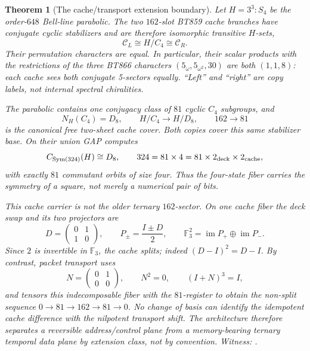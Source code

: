 \documentclass[11pt]{article}
\newtheorem{theorem}{Theorem}[section]
\newcommand{\GF}[1]{\mathbb{F}_{#1}}
\begin{document}
\begin{theorem}[The cache/transport extension boundary]
\label{thm:cache-transport-boundary}
Let $H=3^3{:}S_4$ be the order-$648$ Bell-line parabolic.  The two
$162$-slot BT859 cache branches have conjugate cyclic stabilizers and
are therefore isomorphic transitive $H$-sets,
\[
  \mathcal C_L\cong H/C_4\cong\mathcal C_R.
\]
Their permutation characters are equal.  In particular, their scalar
products with the restrictions of the three BT866 characters
$(5_\omega,5_{\omega^2},30)$ are both $(1,1,8)$: each cache sees both
conjugate 5-sectors equally.  ``Left'' and ``right'' are copy labels,
not internal spectral chiralities.

The parabolic contains one conjugacy class of $81$ cyclic $C_4$
subgroups, and
\[
 N_H(C_4)=D_8,
 \qquad
 H/C_4\longrightarrow H/D_8,
 \qquad
 162\longrightarrow81
\]
is the canonical free two-sheet cache cover.  Both copies cover this
same stabilizer base.  On their union GAP computes
\[
 C_{\operatorname{Sym}(324)}(H)\cong D_8,
 \qquad
 324=81\times4=81\times2_{\rm deck}\times2_{\rm cache},
\]
with exactly $81$ commutant orbits of size four.  Thus the four-state
fiber carries the symmetry of a square, not merely a numerical pair of
bits.

This cache carrier is not the older ternary $162$-sector.  On one
cache fiber the deck swap and its two projectors are
\[
 D=\begin{pmatrix}0&1\\1&0\end{pmatrix},
 \qquad
 P_\pm=\frac{I\pm D}{2},
 \qquad
 \GF3^2=\operatorname{im}P_+\oplus\operatorname{im}P_-.
\]
Since $2$ is invertible in $\GF3$, the cache splits; indeed
$(D-I)^2=D-I$.  By contrast, packet transport uses
\[
 N=\begin{pmatrix}0&1\\0&0\end{pmatrix},
 \qquad N^2=0,
 \qquad (I+N)^3=I,
\]
and tensors this indecomposable fiber with the $81$-register to obtain
the non-split sequence $0\to81\to162\to81\to0$.  No change of basis
can identify the idempotent cache difference with the nilpotent
transport shift.  The architecture therefore separates a reversible
\emph{address/control plane} from a memory-bearing ternary
\emph{temporal data plane} by extension class, not by convention.
\emph{Witness:
.}
\end{theorem}
\end{document}
